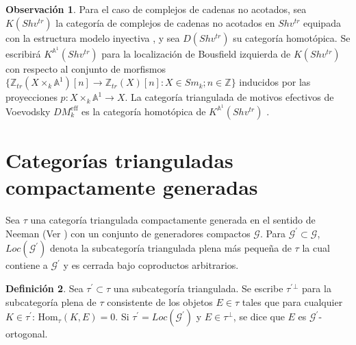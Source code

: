\documentclass[10pt]{amsart}
\theoremstyle{definition}
\newtheorem{definition}{Definici\'on}[section]
\newtheorem{obs}[definition]{Observaci\'on}
\theoremstyle{remark}
\theoremstyle{definition}
\begin{document}
\begin{obs}
Para el caso de complejos de cadenas no acotados, sea $K(Shv^{tr})$ la categoría de complejos de cadenas no acotados en $Shv^{tr}$ equipada con la estructura modelo inyectiva \cite[Prop. 3.13]{Bek00}, y sea $D(Shv^{tr})$ su categoría homotópica. Se escribirá $K^{\mathbb{A}^{1}}(Shv^{tr})$ para la localización de Bousfield izquierda \cite[3.3]{Hir03} de $K(Shv^{tr})$ con respecto al conjunto de morfismos $\{\mathbb{Z}_{tr}(X\times_{k}\mathbb{A}^{1})[n]\rightarrow\mathbb{Z}_{tr}(X)[n]:X \in Sm_{k};n\in\mathbb{Z}\}$ inducidos por las proyecciones $p:X\times_{k}\mathbb{A}^{1}\to X$. La categoría triangulada de motivos efectivos de Voevodsky $DM_{k}^{\mathrm{eff}}$ es la categoría homotópica de $K^{\mathbb{A}^{1}}(Shv^{tr})$ \cite{Voe00b}.
\end{obs}

\newpage
\section{Categor\'ias trianguladas compactamente generadas}
Sea $\tau$ una categoría triangulada compactamente generada en el sentido de Neeman (Ver \cite{Nee01}) con un conjunto de generadores compactos $\mathcal{G}$. Para $\mathcal{G}^{\prime} \subset \mathcal{G}$, $Loc(\mathcal{G}^{\prime})$ denota la subcategoría triangulada plena más pequeña de $\tau$ la cual contiene a $\mathcal{G}^{\prime}$ y es cerrada bajo coproductos arbitrarios. 
\begin{definition}\label{DEF1}
Sea $\tau^{\prime} \subset \tau$ una subcategor\'ia triangulada. Se escribe $\tau^{\prime}{^{\perp}}$ para la subcategor\'ia plena de $\tau$ consistente de los objetos $E \in \tau$ tales que para cualquier $K \in \tau^{\prime}$: $\mathrm{Hom}_{\tau}(K,E)=0$. Si $\tau^{\prime}=Loc(\mathcal{G}^{\prime})$ y $E \in \tau^{\perp}$, se dice que $E$ es $\mathcal{G}^{\prime}$-ortogonal.
\end{definition}
\end{document}
